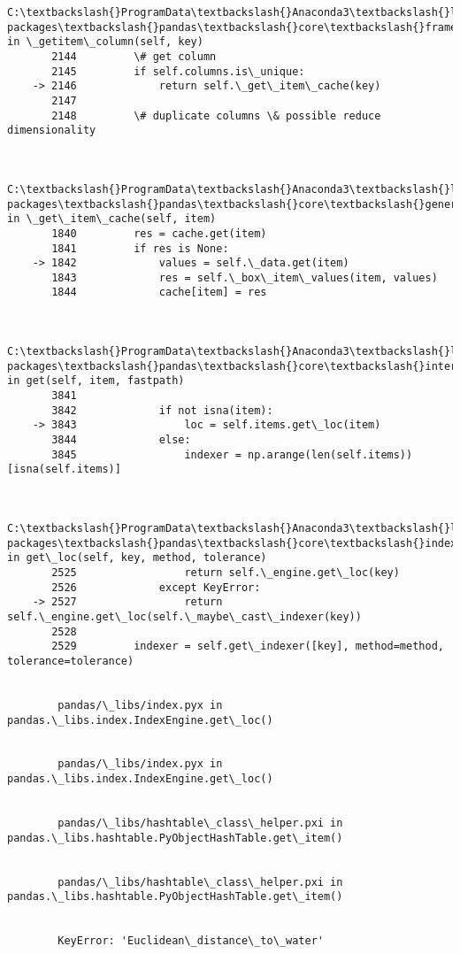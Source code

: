 \documentclass[11pt]{article}
\begin{document}
\begin{Verbatim}[commandchars=\\\{\}]
        C:\textbackslash{}ProgramData\textbackslash{}Anaconda3\textbackslash{}lib\textbackslash{}site-packages\textbackslash{}pandas\textbackslash{}core\textbackslash{}frame.py in \_getitem\_column(self, key)
       2144         \# get column
       2145         if self.columns.is\_unique:
    -> 2146             return self.\_get\_item\_cache(key)
       2147 
       2148         \# duplicate columns \& possible reduce dimensionality
    

        C:\textbackslash{}ProgramData\textbackslash{}Anaconda3\textbackslash{}lib\textbackslash{}site-packages\textbackslash{}pandas\textbackslash{}core\textbackslash{}generic.py in \_get\_item\_cache(self, item)
       1840         res = cache.get(item)
       1841         if res is None:
    -> 1842             values = self.\_data.get(item)
       1843             res = self.\_box\_item\_values(item, values)
       1844             cache[item] = res
    

        C:\textbackslash{}ProgramData\textbackslash{}Anaconda3\textbackslash{}lib\textbackslash{}site-packages\textbackslash{}pandas\textbackslash{}core\textbackslash{}internals.py in get(self, item, fastpath)
       3841 
       3842             if not isna(item):
    -> 3843                 loc = self.items.get\_loc(item)
       3844             else:
       3845                 indexer = np.arange(len(self.items))[isna(self.items)]
    

        C:\textbackslash{}ProgramData\textbackslash{}Anaconda3\textbackslash{}lib\textbackslash{}site-packages\textbackslash{}pandas\textbackslash{}core\textbackslash{}indexes\textbackslash{}base.py in get\_loc(self, key, method, tolerance)
       2525                 return self.\_engine.get\_loc(key)
       2526             except KeyError:
    -> 2527                 return self.\_engine.get\_loc(self.\_maybe\_cast\_indexer(key))
       2528 
       2529         indexer = self.get\_indexer([key], method=method, tolerance=tolerance)
    

        pandas/\_libs/index.pyx in pandas.\_libs.index.IndexEngine.get\_loc()
    

        pandas/\_libs/index.pyx in pandas.\_libs.index.IndexEngine.get\_loc()
    

        pandas/\_libs/hashtable\_class\_helper.pxi in pandas.\_libs.hashtable.PyObjectHashTable.get\_item()
    

        pandas/\_libs/hashtable\_class\_helper.pxi in pandas.\_libs.hashtable.PyObjectHashTable.get\_item()
    

        KeyError: 'Euclidean\_distance\_to\_water'

    \end{Verbatim}


    
    
    
    
\end{document}
